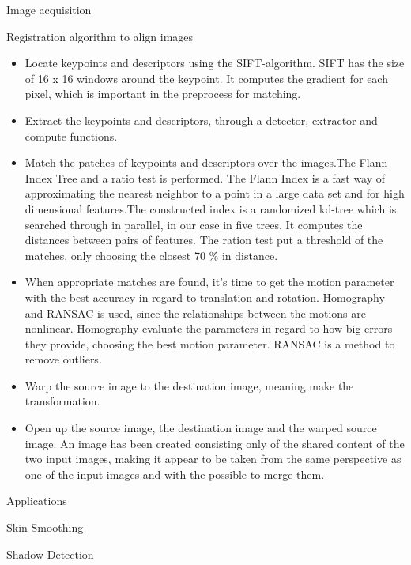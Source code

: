 \documentclass[11pt]{article}
\begin{document}
\begin{section}{Image acquisition}
\begin{subsection}{Registration algorithm to align images}
\begin{itemize}
            \item Locate keypoints and descriptors using the SIFT-algorithm. SIFT has the size of 16 x 16 windows around the keypoint. It computes the gradient for each pixel, which is important in the preprocess for matching.

            \item Extract the keypoints and descriptors, through a detector, extractor and compute functions.

            \item Match the patches of keypoints and descriptors over the images.The Flann Index Tree and a ratio test is performed. The Flann Index is a fast way of approximating the nearest neighbor to a point in a large data set and for high dimensional features.The constructed index is a randomized kd-tree which is searched through in parallel, in our case in five trees. It computes the distances between pairs of features. The ration test put a threshold of the matches, only choosing the closest 70 \% in distance.

            \item When appropriate matches are found, it’s time to get the motion parameter with the best accuracy in regard to translation and rotation. Homography and RANSAC is used, since the relationships between the motions are nonlinear. Homography evaluate the parameters in regard to how big errors they provide, choosing the best motion parameter. RANSAC is a method to remove outliers.

            \item Warp the source image to the destination image, meaning make the transformation.

            \item Open up the source image, the destination image and the warped source image. An image has been created consisting only of the shared content of the two input images, making it appear to be taken from the same perspective as one of the input images and with the possible to merge them.

        \end{itemize}
    \end{subsection} %

\end{section} %

\begin{section}{Applications}

    \begin{subsection}{Skin Smoothing}
        \label{sec:skin_smoothing}
    \end{subsection}

    \begin{subsection}{Shadow Detection}
        \label{sec:shadow_detection}
    \end{subsection}

\end{section}
\end{document}
